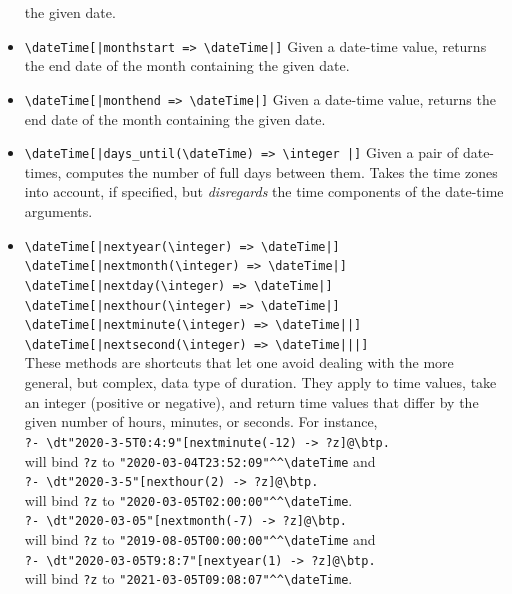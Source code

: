 \documentclass[11pt]{article}
\newcommand{\bs}{\textbackslash}
\begin{document}
\begin{itemize}
  the given date.
\item \texttt{\bs{}dateTime[|monthstart => \bs{}dateTime|]}
  Given a date-time value, returns the end date of the month containing
  the given date.
\item \texttt{\bs{}dateTime[|monthend => \bs{}dateTime|]}
  Given a date-time value, returns the end date of the month containing
  the given date.
\item \texttt{\bs{}dateTime[|days\_until(\bs{}dateTime) => \bs{}integer |]}
  Given a pair of date-times, computes the number of full days between them.
  Takes the time zones into account, if specified,
  but \emph{disregards} the time components of
  the date-time arguments. 
\item {\tt \bs{}dateTime[|nextyear(\bs{}integer) => \bs{}dateTime|]}  
  \\
{\tt \bs{}dateTime[|nextmonth(\bs{}integer) => \bs{}dateTime|]}  
  \\
{\tt \bs{}dateTime[|nextday(\bs{}integer) => \bs{}dateTime|]}  
  \\
{\tt \bs{}dateTime[|nexthour(\bs{}integer) => \bs{}dateTime|]}  
  \\
  \texttt{\bs{}dateTime[|nextminute(\bs{}integer) => \bs{}dateTime||]}
  \\
  \texttt{\bs{}dateTime[|nextsecond(\bs{}integer) => \bs{}dateTime|||]}
  \\
  These methods are shortcuts that let one avoid dealing with the more
  general, but complex, data type of duration.
  They apply to time values, take an integer (positive or negative), and return time
  values that differ by the given number of hours, minutes, or seconds.
  For instance,
  \\
  \hspace*{1cm}\verb|?- \dt"2020-3-5T0:4:9"[nextminute(-12) -> ?z]@\btp.|
  \\
  will bind \texttt{?z} to \verb|"2020-03-04T23:52:09"^^\dateTime| and 
  \\
  \hspace*{1cm}\verb|?- \dt"2020-3-5"[nexthour(2) -> ?z]@\btp.|
  \\
  will bind \texttt{?z} to \verb|"2020-03-05T02:00:00"^^\dateTime|.
  \\
  \hspace*{1cm}\verb|?- \dt"2020-03-05"[nextmonth(-7) -> ?z]@\btp.|
  \\
  will bind \texttt{?z} to  \verb|"2019-08-05T00:00:00"^^\dateTime| and
  \\
  \hspace*{1cm}\verb|?- \dt"2020-03-05T9:8:7"[nextyear(1) -> ?z]@\btp.|
  \\
  will bind \texttt{?z} to  \verb|"2021-03-05T09:08:07"^^\dateTime|.
\end{itemize}
\end{document}
